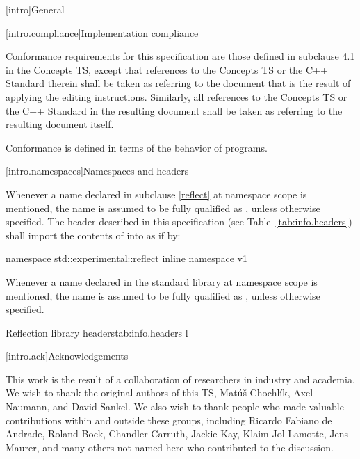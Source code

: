 
[intro]{General}

[intro.compliance]{Implementation compliance}

\pnum
Conformance requirements for this specification are those defined in subclause
4.1 in the Concepts TS, except that references to the Concepts TS or the C++
Standard therein shall be taken as referring to the document that is the result
of applying the editing instructions. Similarly, all references to the Concepts
TS or the C++ Standard in the resulting document shall be taken as referring to
the resulting document itself.
\begin{note}
Conformance is defined in terms of the behavior of programs.
\end{note}

[intro.namespaces]{Namespaces and headers}

\pnum
Whenever a name  declared in subclause \ref{reflect} at namespace scope
is mentioned, the name  is assumed to be fully qualified as
, unless otherwise specified.
The header described in this specification (see Table~\ref{tab:info.headers})
shall import the contents of  into
 as if by:

\begin{codeblock}
namespace std::experimental::reflect {
  inline namespace v1 {}
}
\end{codeblock}

\pnum
Whenever a name  declared in the standard library at namespace scope is
mentioned, the name  is assumed to be fully qualified as
, unless otherwise specified.

\begin{floattable}{Reflection library headers}{tab:info.headers}
{l}
\topline
{} \\
\end{floattable}

[intro.ack]{Acknowledgements}

\pnum
This work is the result of a collaboration of researchers in industry and
academia.  We wish to thank the original authors of this TS, Matúš
Chochlík, Axel Naumann, and David Sankel. We also wish to thank people who made
valuable contributions within and outside these groups, including Ricardo
Fabiano de Andrade, Roland Bock, Chandler Carruth, Jackie Kay, Klaim-Jol
Lamotte, Jens Maurer, and many others not named here who contributed to the
discussion.
